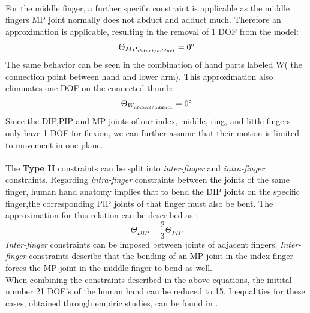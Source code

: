 \\For the middle finger, a further specific constraint is applicable as the middle fingers MP joint normally does not abduct and adduct much. Therefore an approximation is applicable, resulting in the removal of 1 DOF from the model:
\begin{equation}
\Theta _{MP_{abduct/adduct}}=0\degree
\end{equation}
The same behavior can be seen in the combination of hand parts labeled W( the connection point between hand and lower arm). This approximation also eliminates one DOF on the connected thumb:
\begin{equation}
\Theta _{W_{abduct/adduct}}=0\degree
\end{equation}
Since the DIP,PIP and MP joints of our index, middle, ring, and little fingers only have 1 DOF for flexion, we can further assume that their motion is limited to movement in one plane. \\\\
The \textbf{Type II} constraints can be split into \textit{inter-finger} and\textit{ intra-finger} constraints.
Regarding \textit{intra-finger} constraints between the joints of the same finger, human hand anatomy implies that to bend the DIP joints on the specific finger,the corresponding PIP joints of that finger must also be bent.
The approximation for this relation\cite{Rijpkema.1991} can be described as :
\begin{equation}
\Theta _{DIP} =\frac{2}{3}\Theta _{PIP}
\end{equation}
\textit{Inter-finger} constraints can be imposed between joints of adjacent fingers. \textit{Inter-finger} constraints describe that the bending of an MP joint in the index finger forces the MP joint in the middle finger to bend as well.\\
 When combining the constraints described in the above equations, the initital number 21 DOF's of the human hand can be reduced to 15. Inequalities for these cases, obtained through empiric studies, can be found in \cite{LEE.1995}.\\
